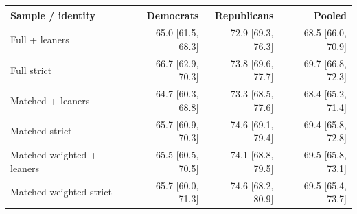 \begin{tabular}{lrrr}
\toprule
Sample / identity & Democrats & Republicans & Pooled \\
\midrule
Full + leaners & 65.0 [61.5, 68.3] & 72.9 [69.3, 76.3] & 68.5 [66.0, 70.9] \\
Full strict & 66.7 [62.9, 70.3] & 73.8 [69.6, 77.7] & 69.7 [66.8, 72.3] \\
Matched + leaners & 64.7 [60.3, 68.8] & 73.3 [68.5, 77.6] & 68.4 [65.2, 71.4] \\
Matched strict & 65.7 [60.9, 70.3] & 74.6 [69.1, 79.4] & 69.4 [65.8, 72.8] \\
Matched weighted + leaners & 65.5 [60.5, 70.5] & 74.1 [68.8, 79.5] & 69.5 [65.8, 73.1] \\
Matched weighted strict & 65.7 [60.0, 71.3] & 74.6 [68.2, 80.9] & 69.5 [65.4, 73.7] \\
\bottomrule
\end{tabular}
